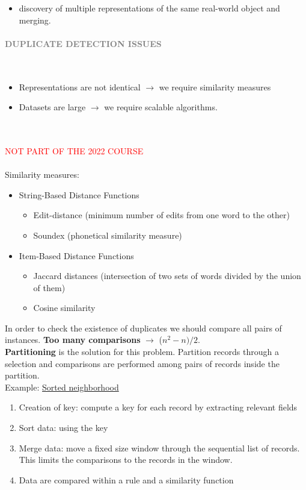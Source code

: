 \documentclass[10pt,a4paper]{article}
\newcommand{\nline}{\\~\\}
\newcommand{\myparagraph}[1]{\paragraph{\normalsize{\textcolor{gray}{\uppercase{\textbf{#1}}}} }\mbox{} \vspace{0.5em}\\}
\begin{document}
\begin{justify}
\begin{itemize}
\begin{itemize}
		\item discovery of multiple representations of the same real-world object and merging.
	\end{itemize}	
\end{itemize}
\myparagraph{Duplicate Detection Issues}
\begin{itemize}
	\item Representations are not identical $\rightarrow$ we require similarity measures
	\item Datasets are large $\rightarrow$ we require scalable algorithms.
\end{itemize} \nline
\textcolor{red}{NOT PART OF THE 2022 COURSE}
\nline
Similarity measures:
\begin{itemize}
	\item String-Based Distance Functions
	\begin{itemize}
		\item Edit-distance (minimum number of edits from one word to the other)
		\item Soundex (phonetical similarity measure)
	\end{itemize}
	\item Item-Based Distance Functions
	\begin{itemize}
		\item Jaccard distances (intersection of two sets of words divided by the union of them)
		\item Cosine similarity
	\end{itemize}
\end{itemize}
In order to check the existence of duplicates we should compare all pairs of instances. \textbf{Too many comparisons} $\rightarrow$ ($n^2-n)/2$. \\
\textbf{Partitioning} is the solution for this problem. Partition records through a selection and comparisons are performed among pairs of records inside the partition. \\ 
Example: \uline{Sorted neighborhood}
\begin{enumerate}
	\item Creation of key: compute a key for each record by extracting relevant fields
	\item Sort data: using the key 
	\item Merge data: move a fixed size window through the sequential list of records. This limits the comparisons to the records in the window. 
	\item Data are compared within a rule and a similarity function
\end{enumerate}

\end{justify}
\end{document}
